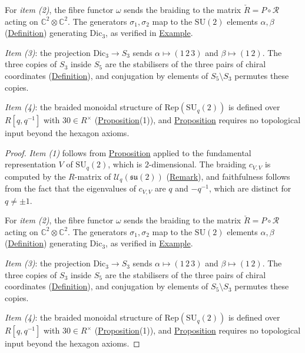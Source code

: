 \begin{corollary}
For \emph{item (2)}, the fibre functor $\omega$ sends the braiding to the
matrix $\check{R} = P \circ \mathcal{R}$ acting on
$\mathbb{C}^2 \otimes \mathbb{C}^2$.  The generators $\sigma_1, \sigma_2$
map to the $\mathrm{SU}(2)$ elements $\alpha, \beta$
(\hyperref[def:su2-generators]{Definition}) generating $\mathrm{Dic}_3$, as
verified in \hyperref[ex:trefoil-operator-algebra]{Example}.

\emph{Item (3)}: the projection $\mathrm{Dic}_3 \to S_3$ sends
$\alpha \mapsto (1\,2\,3)$ and $\beta \mapsto (1\,2)$.  The three
copies of $S_3$ inside $S_5$ are the stabilisers of the three pairs
of chiral coordinates
(\hyperref[def:chiral-sector-coords]{Definition}), and conjugation by
elements of $S_5 \setminus S_3$ permutes these copies.

\emph{Item (4)}: the braided monoidal structure of
$\mathrm{Rep}(\mathrm{SU}_q(2))$ is defined over $R[q, q^{-1}]$
with $30 \in R^{\times}$
(\hyperref[prop:brings-is-qou]{Proposition}(1)), and
\hyperref[prop:braid-action-tensor]{Proposition} requires no topological
input beyond the hexagon axioms.
\end{corollary}
\begin{proof}
\emph{Item (1)} follows from \hyperref[prop:braid-action-tensor]{Proposition}
applied to the fundamental representation $V$ of
$\mathrm{SU}_q(2)$, which is $2$-dimensional.  The braiding
$c_{V,V}$ is computed by the $R$-matrix of
$\mathcal{U}_q(\mathfrak{su}(2))$
(\hyperref[rem:r-matrix-braiding]{Remark}), and faithfulness follows from the
fact that the eigenvalues of $c_{V,V}$ are $q$ and $-q^{-1}$, which
are distinct for $q \neq \pm 1$.

For \emph{item (2)}, the fibre functor $\omega$ sends the braiding to the
matrix $\check{R} = P \circ \mathcal{R}$ acting on
$\mathbb{C}^2 \otimes \mathbb{C}^2$.  The generators $\sigma_1, \sigma_2$
map to the $\mathrm{SU}(2)$ elements $\alpha, \beta$
(\hyperref[def:su2-generators]{Definition}) generating $\mathrm{Dic}_3$, as
verified in \hyperref[ex:trefoil-operator-algebra]{Example}.

\emph{Item (3)}: the projection $\mathrm{Dic}_3 \to S_3$ sends
$\alpha \mapsto (1\,2\,3)$ and $\beta \mapsto (1\,2)$.  The three
copies of $S_3$ inside $S_5$ are the stabilisers of the three pairs
of chiral coordinates
(\hyperref[def:chiral-sector-coords]{Definition}), and conjugation by
elements of $S_5 \setminus S_3$ permutes these copies.

\emph{Item (4)}: the braided monoidal structure of
$\mathrm{Rep}(\mathrm{SU}_q(2))$ is defined over $R[q, q^{-1}]$
with $30 \in R^{\times}$
(\hyperref[prop:brings-is-qou]{Proposition}(1)), and
\hyperref[prop:braid-action-tensor]{Proposition} requires no topological
input beyond the hexagon axioms.
\end{proof}

